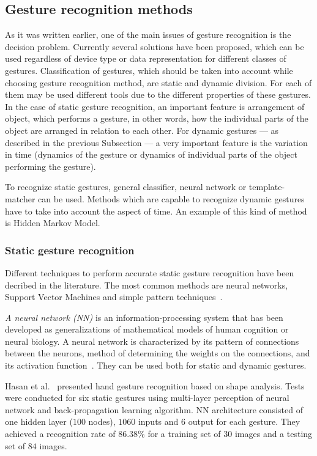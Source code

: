 \subsection{Gesture recognition methods}\label{DynamicStaticText}
As it was written earlier, one of the main issues of gesture recognition is the decision problem. Currently several solutions have been proposed, which can be used regardless of device type or data representation for different classes of gestures. Classification of gestures, which should be taken into account while choosing gesture recognition method, are static and dynamic division. For each of them may be used different tools due to the different properties of these gestures. In the case of static gesture recognition, an important feature is arrangement of object, which performs a gesture, in other words, how the individual parts of the object are arranged in relation to each other. For dynamic gestures --- as described in the previous Subsection --- a very important feature is the variation in time (dynamics of the gesture or dynamics of individual parts of the object performing the gesture).

To recognize static gestures, general classifier, neural network or template-matcher can be used. Methods which are capable to recognize dynamic gestures have to take into account the aspect of time. An example of this kind of method is Hidden Markov Model.

\subsubsection*{Static gesture recognition}

Different techniques to perform accurate static gesture recognition have been decribed in the literature. The most common methods are neural networks, Support Vector Machines and simple pattern techniques~\cite{journals/jbcs/SavarisW10}.

\emph{A neural network (NN)} is an information-processing system that has been developed as generalizations of mathematical models of human cognition or neural biology. A neural network is characterized by its pattern of connections between the neurons, method of determining the weights on the connections, and its activation function~\cite{Fausett:1994:FNN:197023}. They can be used both for static and dynamic gestures.

Hasan et al.~\cite{HasanStaticHand} presented hand gesture recognition based on shape analysis. Tests were conducted for six static gestures using multi-layer perception of neural network and back-propagation learning algorithm. NN architecture consisted of one hidden layer ($100$ nodes), $1060$ inputs and $6$ output for each gesture. They achieved a recognition rate of $86.38\%$ for a training set of $30$ images and a testing set of $84$ images.


